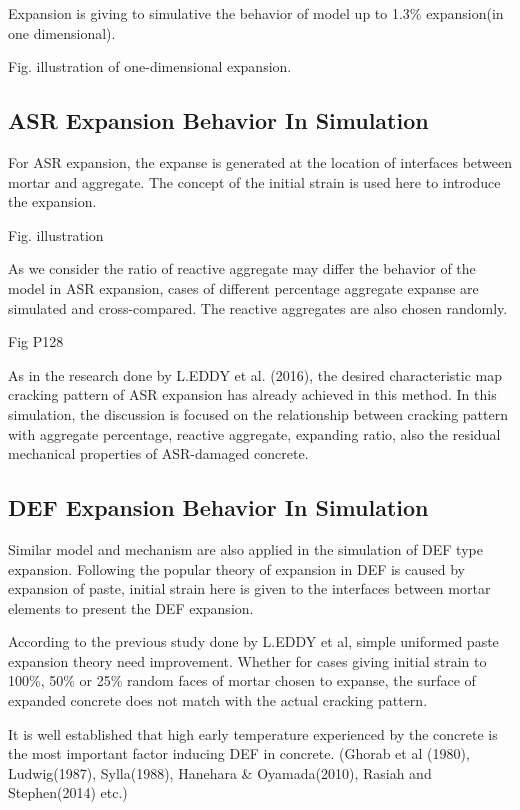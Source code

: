 Expansion is giving to simulative the behavior of model up to 1.3\% expansion(in one dimensional).

Fig. illustration of one-dimensional expansion.

\subsection{ASR Expansion Behavior In Simulation}

For ASR expansion, the expanse is generated at the location of interfaces between mortar and aggregate. The concept of the initial strain is used here to introduce the expansion.

Fig. illustration

As we consider the ratio of reactive aggregate may differ the behavior of the model in ASR expansion,  cases of different percentage aggregate expanse are simulated and cross-compared. The reactive aggregates are also chosen randomly.

Fig P128

As in the research done by L.EDDY et al. (2016), the desired characteristic map cracking pattern of ASR expansion has already achieved in this method. In this simulation, the discussion is focused on the relationship between cracking pattern with aggregate percentage, reactive aggregate, expanding ratio, also the residual mechanical properties of ASR-damaged concrete.

\subsection{DEF Expansion Behavior In Simulation}

Similar model and mechanism are also applied in the simulation of DEF  type expansion. Following the popular theory of expansion in DEF  is caused by expansion of paste, initial strain here is given to the interfaces between mortar elements to present the DEF expansion.

According to the previous study done by L.EDDY et al, simple uniformed paste expansion theory need improvement. Whether for cases giving initial strain to 100\%, 50\% or 25\% random faces of mortar chosen to expanse, the surface of expanded concrete does not match with the actual cracking pattern.

It is well established that high early temperature experienced by the concrete is the most important factor inducing DEF in concrete. (Ghorab et al (1980), Ludwig(1987), Sylla(1988), Hanehara \& Oyamada(2010), Rasiah and Stephen(2014) etc.)

